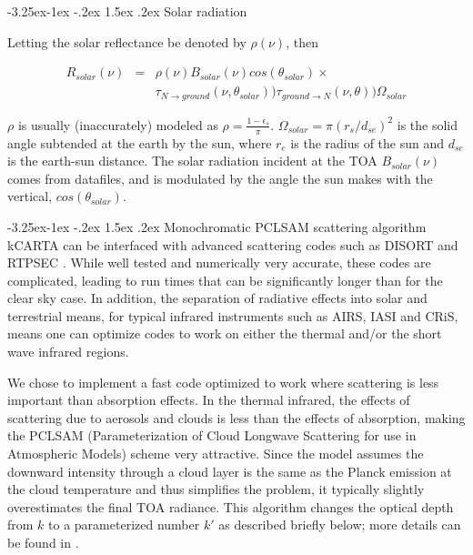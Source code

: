\documentclass[11pt]{article}
\makeatletter
\newcommand{\kc}{\textsf{kCARTA}\xspace}
\renewcommand{\subsection}{\@startsection{subsection}{2}{\z@}%
                                     {-3.25ex\@plus -1ex \@minus -.2ex}%
                                     {1.5ex \@plus .2ex}%
                                     {\reset@font\normalsize\bfseries}}
\makeatother
\begin{document}
\subsection{Solar radiation}

Letting the solar reflectance be denoted by $\rho(\nu)$, then

\begin{eqnarray*}
R_{solar}(\nu) & = & \rho(\nu) B_{solar}(\nu) cos(\theta_{solar}) \times \\
& &                 \tau_{N \rightarrow ground}(\nu,\theta_{solar}))
                 \tau_{ground \rightarrow N}(\nu,\theta))
                 \Omega_{solar}
\end{eqnarray*}

$\rho$ is usually (inaccurately) modeled as
$\rho = \frac{1 - \epsilon_{s}}{\pi}$.
$\Omega_{solar} = \pi(r_{s}/d_{se})^{2}$ is the solid angle subtended at the
earth by the sun, where $r_{e}$ is the radius of the sun and $d_{se}$ is the
earth-sun distance. The solar radiation incident at the TOA $B_{solar}(\nu)$
comes from datafiles, and is modulated by the angle the sun makes with the
vertical, $cos(\theta_{solar})$.

\subsection{\textsf{Monochromatic PCLSAM} scattering algorithm}
\kc can be interfaced with advanced scattering codes such as DISORT \cite{stam:88}
and RTPSEC \cite{dee:98}. While well tested and numerically very accurate, these codes are
complicated, leading to run times that can be significantly longer than for the clear sky case.
In addition, the separation of radiative effects into solar and terrestrial means, 
for typical infrared instruments such as AIRS, IASI and CRiS, means one can optimize 
codes to work on either the thermal and/or the short wave infrared regions. 

We chose to implement a fast code optimized to work where scattering is
less important than absorption effects. In the thermal infrared, the effects of
scattering due to aerosols and clouds is less than the effects of absorption, making
the \textsf{PCLSAM} (Parameterization of Cloud Longwave Scattering for use in
Atmospheric Models) scheme \cite{cho:99} very attractive. Since the model assumes 
the downward intensity through a cloud layer is the same as the Planck emission at the
cloud temperature and thus simplifies the problem, it typically slightly
overestimates the final TOA radiance. This algorithm changes the optical
depth from $k$ to a parameterized number $k\prime$ as described briefly
below; more details can be found in \cite{cho:99,mat:05}.
\end{document}
